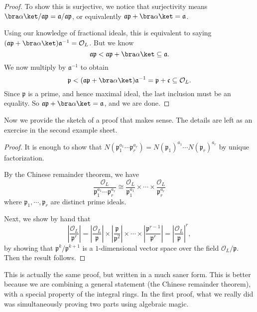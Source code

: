 \documentclass[a4paper]{article}
\begin{document}
\begin{proof}
  To show this is surjective, we notice that surjectivity means $\bra \alpha\ket/\mathfrak{a}\mathfrak{p} = \mathfrak{a}/\mathfrak{a}\mathfrak{p}$, or equivalently $\mathfrak{a}\mathfrak{p} + \bra \alpha\ket = \mathfrak{a}$.

  Using our knowledge of fractional ideals, this is equivalent to saying $(\mathfrak{a}\mathfrak{p} + \bra \alpha\ket) \mathfrak{a}^{-1} = \mathcal{O}_L$. But we know
  \[
    \mathfrak{a}\mathfrak{p} < \mathfrak{a}\mathfrak{p} + \bra \alpha\ket \subseteq \mathfrak{a}.
  \]
  We now multiply by $\mathfrak{a}^{-1}$ to obtain
  \[
    \mathfrak{p} < (\mathfrak{a} \mathfrak{p} + \bra \alpha\ket) \mathfrak{a}^{-1} = \mathfrak{p} + \mathfrak{c} \subseteq \mathcal{O}_L.
  \]
  Since $\mathfrak{p}$ is a prime, and hence maximal ideal, the last inclusion must be an equality. So $\mathfrak{a}\mathfrak{p} + \bra\alpha\ket = \mathfrak{a}$, and we are done.
\end{proof}

Now we provide the sketch of a proof that makes sense. The details are left as an exercise in the second example sheet.
\begin{proof}
  It is enough to show that $N(\mathfrak{p}_1^{a_1} \cdots \mathfrak{p}_r^{a_r}) = N(\mathfrak{p}_1)^{a_1} \cdots N(\mathfrak{p}_r)^{a_r}$ by unique factorization.

  By the Chinese remainder theorem, we have
  \[
    \frac{\mathcal{O}_L}{\mathfrak{p}_1^{a_1} \cdots \mathfrak{p}_r^{a_r}} \cong \frac{\mathcal{O}_L}{\mathfrak{p}_1^{a_1}} \times \cdots \times \frac{\mathcal{O}_L}{\mathfrak{p}_r^{a_r}}
  \]
  where $\mathfrak{p}_1, \cdots, \mathfrak{p}_r$ are distinct prime ideals.

  Next, we show by hand that
  \[
    \left|\frac{\mathcal{O}_L}{\mathfrak{p}^r}\right| = \left|\frac{\mathcal{O}_L}{\mathfrak{p}}\right| \times \left|\frac{\mathfrak{p}}{\mathfrak{p}^2}\right| \times \cdots \times \left|\frac{\mathfrak{p}^{r - 1}}{\mathfrak{p}^r}\right| = \left|\frac{\mathcal{O}_L}{\mathfrak{p}}\right|^r,
  \]
  by showing that $\mathfrak{p}^k/\mathfrak{p}^{k + 1}$ is a $1$-dimensional vector space over the field $\mathcal{O}_L/\mathfrak{p}$. Then the result follows. %
\end{proof}
This is actually the same proof, but written in a much saner form. This is better because we are combining a general statement (the Chinese remainder theorem), with a special property of the integral rings. In the first proof, what we really did was simultaneously proving two parts using algebraic magic.
\end{document}
